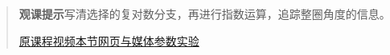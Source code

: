 \begin{quote}\small\textbf{观课提示}\quad 写清选择的复对数分支，再进行指数运算，追踪整圈角度的信息。

\href{https://www.youtube.com/watch?v=pq9LcwC7CoY}{原课程视频}\quad\href{https://vitael04213.github.io/3blue1brown-notes/lessons/ldm-i-to-i.html}{本节网页与媒体}\quad\href{https://vitael04213.github.io/3blue1brown-notes/lab.html\#complex}{参数实验}
\end{quote}
